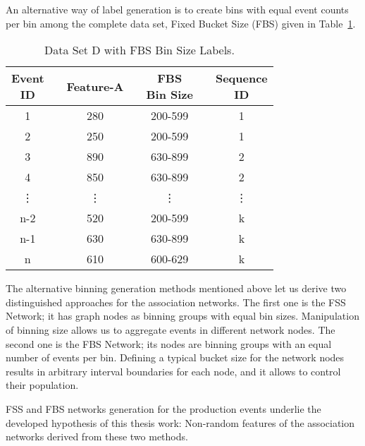 An alternative way of label generation is to create bins with equal event counts per bin among the complete data set, Fixed Bucket Size (FBS) given in Table~\ref{Tab: D-dataset-FBS}.
\begin{table}[ht!]
	\centering
	\setlength{\arrayrulewidth}{0.75pt}%
	\begin{tabular}{|cc|c|ccc|c|}
		\hline \rowcolor[HTML]{FFFFC7}
		\makecell{Event\\ID} 	&& Feature-A    	&& \makecell{FBS\\Bin Size}&& \makecell{Sequence\\ID} \\ \hline
		1 	      && 280	    && 200-599	&& 1 		     \\
		2 		  && 250	    && 200-599	&& 1 		     \\
		3 	      && 890	    && 630-899	&& 2 		     \\
		4 		  && 850	    && 630-899	&& 2 		     \\
		\vdots	  && \vdots  	&& \vdots	&& \vdots 	     \\
		n-2 	  && 520	    && 200-599	&& k 		     \\
		n-1       && 630	    && 630-899	&& k 		     \\
		n 		  && 610	    && 600-629	&& k 		     \\ \hline
	\end{tabular}
	\caption{Data Set D with FBS Bin Size Labels.}
	\label{Tab: D-dataset-FBS}
\end{table}
The alternative binning generation methods mentioned above let us derive two distinguished approaches for the association networks. The first one is the FSS Network; it has graph nodes as binning groups with equal bin sizes. Manipulation of binning size allows us to aggregate events in different network nodes. The second one is the FBS Network; its nodes are binning groups with an equal number of events per bin. Defining a typical bucket size for the network nodes results in arbitrary interval boundaries for each node, and it allows to control their population.


{\color{red}FSS and FBS networks generation for the production events underlie the developed hypothesis of this thesis work: Non-random features of the association networks derived from these two methods.}